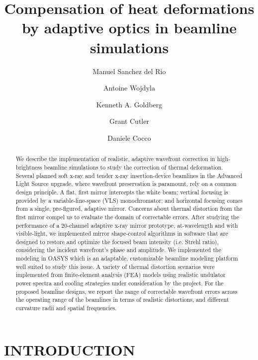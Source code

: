 \documentclass[]{spie}  %
\title{Compensation of heat deformations by adaptive optics in beamline simulations}
\author[a]{Manuel Sanchez del Rio}
\author[a]{Antoine Wojdyla}
\author[a]{Kenneth A. Goldberg}
\author[a]{Grant Cutler}
\author[a]{Daniele Cocco}
\affil[a]{LBNL, 1 Cyclotron Road, Berkeley CA, USA}
\begin{document}
 
\maketitle

\begin{abstract}
We describe the implementation of realistic, adaptive wavefront correction in high-brightness beamline simulations to study the correction of thermal deformation. Several planned soft x-ray and tender x-ray insertion-device beamlines in the Advanced Light Source upgrade, where wavefront preservation is paramount, rely on a common design principle. A flat, first mirror intercepts the white beam; vertical focusing is provided by a variable-line-space (VLS) monochromator; and horizontal focusing comes from a single, pre-figured, adaptive mirror. Concerns about thermal distortion from the first mirror compel us to evaluate the domain of correctable errors. After studying the performance of a 20-channel adaptive x-ray mirror prototype, at-wavelength and with visible-light, we implemented mirror shape-control algorithms in software that are designed to restore and optimize the focused beam intensity (i.e. Strehl ratio), considering the incident wavefront’s phase and amplitude. We implemented the modeling in OASYS which is an adaptable, customizable beamline modeling platform well suited to study this issue. A variety of thermal distortion scenarios were implemented from finite-element analysis (FEA) models using realistic undulator power spectra and cooling strategies under consideration by the project. For the proposed beamline designs, we report the range of correctable wavefront errors across the operating range of the beamlines in terms of realistic distortions, and different curvature radii and spatial frequencies.


\end{abstract}


\section{INTRODUCTION}
\label{sec:intro}  
\end{document}
